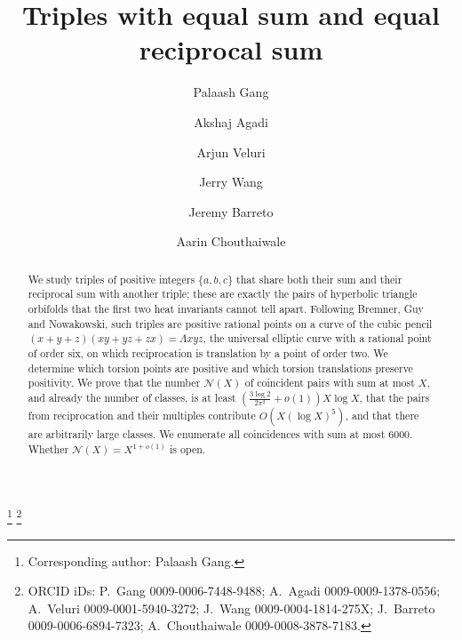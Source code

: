 \documentclass[11pt]{amsart}
\theoremstyle{definition}
\theoremstyle{remark}
\newcommand{\N}{\mathcal{N}}
\begin{document}
\title{Triples with equal sum and equal reciprocal sum}

\author[P.~Gang]{Palaash Gang}
\address{Indus International School, Pune, India}
\thanks{Corresponding author: Palaash Gang.}
\thanks{ORCID iDs: P.~Gang 0009-0006-7448-9488; A.~Agadi 0009-0009-1378-0556; A.~Veluri 0009-0001-5940-3272; J.~Wang 0009-0004-1814-275X; J.~Barreto 0009-0006-6894-7323; A.~Chouthaiwale 0009-0008-3878-7183.}

\author[A.~Agadi]{Akshaj Agadi}
\address{Texas A\&M University, College Station, Texas, USA}

\author[A.~Veluri]{Arjun Veluri}
\address{Indus International School, Pune, India}

\author[J.~Wang]{Jerry Wang}
\address{University of California, Irvine, Irvine, California, USA}

\author[J.~Barreto]{Jeremy Barreto}
\address{Lawrence High School, Lawrenceville, New Jersey, USA}

\author[A.~Chouthaiwale]{Aarin Chouthaiwale}
\address{DriveChange Learning and Resource Centre, Pune, India}



\begin{abstract}
We study triples of positive integers $\{a,b,c\}$ that share both their sum and their reciprocal sum with another triple; these are exactly the pairs of hyperbolic triangle orbifolds that the first two heat invariants cannot tell apart. Following Bremner, Guy and Nowakowski, such triples are positive rational points on a curve of the cubic pencil $(x+y+z)(xy+yz+zx)=\Lambda xyz$, the universal elliptic curve with a rational point of order six, on which reciprocation is translation by a point of order two. We determine which torsion points are positive and which torsion translations preserve positivity. We prove that the number $\N(X)$ of coincident pairs with sum at most $X$, and already the number of classes, is at least $(\tfrac{3\log2}{2\pi^2}+o(1))X\log X$, that the pairs from reciprocation and their multiples contribute $O(X(\log X)^5)$, and that there are arbitrarily large classes. We enumerate all coincidences with sum at most $6000$. Whether $\N(X)=X^{1+o(1)}$ is open.
\end{abstract}
\end{document}
